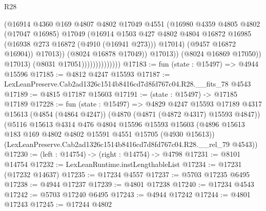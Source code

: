 \begin{lexlean}{R28}
\begin{coremodule}
                                          (@16914
                                            @4360
                                            @169
                                            @4807
                                            @4802
                                            @17049
                                            @4551
                                            (@16980
                                              @4359
                                              @4805
                                              @4802
                                              (@17047 @16985)
                                              @17049
                                              (@16914
                                                @1503
                                                @427
                                                @4802
                                                @4804
                                                @16872
                                                @16985
                                                (@16938 @273 @16872 (@4910 (@16941 @273)))
                                                @17014)
                                              (@9457 @16872 @16904))
                                            @17013))
                                        (@8024 @16878 @17049))
                                      @17013))
                                  (@8024 @16869 @17050))
                                @17013)
                              (@8031 @17051))))))))))))))
@17183 := fun (state : @15497) => @4944 @15596
@17185 := @4812 @4247 @15593
@17187 := LexLeanPreserve.Cab2ad1326c1514b8416cd7d8fd767c04.R28.__fits_78 @4543
@17189 := @4815 @17187 @15603
@17191 := (state : @15497) -> @17185 @17189
@17228 := fun (state : @15497) =>
  @4829
    @4247
    @15593
    @17189
    @4317
    @15613
    (@4854 (@4864 @4247))
    (@4870 (@4871 (@4872 @4317) @15593 @4847))
    (@5116
      @15613
      @4314
      @476
      @4804
      @15596
      @15593
      @15603
      (@4896 @15613 @183 @169 @4802 @4802 @15591 @4551 @15705 (@4930 @15613))
      (LexLeanPreserve.Cab2ad1326c1514b8416cd7d8fd767c04.R28.__rel_79 @4543))
@17230 := (left : @14754) -> (right : @14754) -> @4798
@17231 := @8101 @14754
@17232 := LexLeanRuntime.instLengthableList
@17234 := @17231 (@17232 @14637)
@17235 := @17234 @4557
@17237 := @5703 @17235 @6495
@17238 := @4944 @17237
@17239 := @4801 @17238
@17240 := @17234 @4543
@17242 := @5703 @17240 @6495
@17243 := @4944 @17242
@17244 := @4801 @17243
@17245 := @17244 @4802

\end{coremodule}
\end{lexlean}
